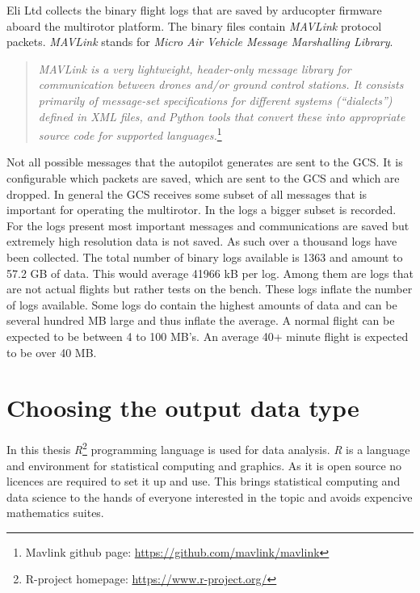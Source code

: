 \documentclass[12pt,oneside]{reedthesis}
\theoremstyle{definition}
\theoremstyle{definition}
\theoremstyle{definition}
\theoremstyle{remark}
\begin{document}
Eli Ltd collects the binary flight logs that are saved by arducopter
firmware aboard the multirotor platform. The binary files contain
\emph{MAVLink} protocol packets. \emph{MAVLink} stands for \emph{Micro
Air Vehicle Message Marshalling Library}.
\begin{quote}
\emph{MAVLink is a very lightweight, header-only message library for
communication between drones and/or ground control stations. It consists
primarily of message-set specifications for different systems
(``dialects'') defined in XML files, and Python tools that convert these
into appropriate source code for supported languages.}\footnote{Mavlink
  github page: \url{https://github.com/mavlink/mavlink}}
\end{quote}
Not all possible messages that the autopilot generates are sent to the
GCS. It is configurable which packets are saved, which are sent to the
GCS and which are dropped. In general the GCS receives some subset of
all messages that is important for operating the multirotor. In the logs
a bigger subset is recorded. For the logs present most important
messages and communications are saved but extremely high resolution data
is not saved. As such over a thousand logs have been collected. The
total number of binary logs available is 1363 and amount to 57.2 GB of
data. This would average 41966 kB per log. Among them are logs that are
not actual flights but rather tests on the bench. These logs inflate the
number of logs available. Some logs do contain the highest amounts of
data and can be several hundred MB large and thus inflate the average. A
normal flight can be expected to be between 4 to 100 MB's. An average
40+ minute flight is expected to be over 40 MB.

\hypertarget{choosing-the-output-data-type}{\section{Choosing the output
data type}\label{choosing-the-output-data-type}}

In this thesis \emph{R}\footnote{R-project homepage:
  \url{https://www.r-project.org/}} programming language is used for
data analysis. \emph{R} is a language and environment for statistical
computing and graphics. As it is open source no licences are required to
set it up and use. This brings statistical computing and data science to
the hands of everyone interested in the topic and avoids expencive
mathematics suites.
\end{document}
